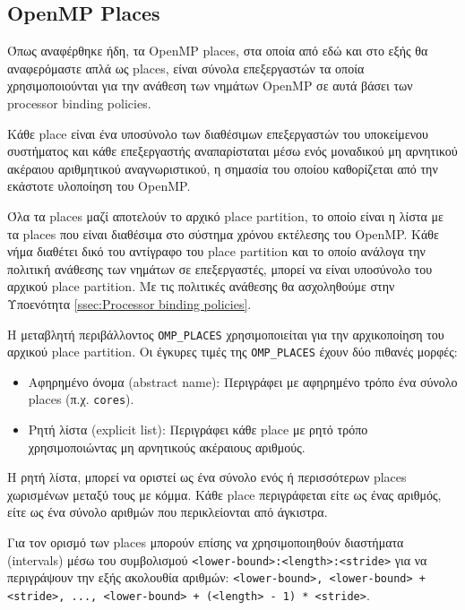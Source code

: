 \subsection{OpenMP Places}
\label{ssec:OpenMP places}
Όπως αναφέρθηκε ήδη, τα OpenMP places, στα οποία από εδώ και στο εξής θα αναφερόμαστε απλά ως places, είναι σύνολα επεξεργαστών τα οποία χρησιμοποιούνται για την ανάθεση των νημάτων OpenMP σε αυτά βάσει των processor binding policies.

Κάθε place είναι ένα υποσύνολο των διαθέσιμων επεξεργαστών του υποκείμενου συστήματος και κάθε επεξεργαστής αναπαρίσταται μέσω ενός μοναδικού μη αρνητικού ακέραιου αριθμητικού αναγνωριστικού, η σημασία του οποίου καθορίζεται από την εκάστοτε υλοποίηση του OpenMP.

Όλα τα places μαζί αποτελούν το αρχικό place partition, το οποίο είναι η λίστα με τα places που είναι διαθέσιμα στο σύστημα χρόνου εκτέλεσης του OpenMP. Κάθε νήμα διαθέτει δικό του αντίγραφο του place partition και το οποίο ανάλογα την πολιτική ανάθεσης των νημάτων σε επεξεργαστές, μπορεί να είναι υποσύνολο του αρχικού place partition. Με τις πολιτικές ανάθεσης θα ασχοληθούμε στην Υποενότητα \ref{ssec:Processor binding policies}.

Η μεταβλητή περιβάλλοντος \texttt{OMP\_PLACES} χρησιμοποιείται για την αρχικοποίηση του αρχικού place partition. Οι έγκυρες τιμές της \texttt{OMP\_PLACES} έχουν δύο πιθανές μορφές:
\begin{itemize}
	\item Αφηρημένο όνομα (abstract name): Περιγράφει με αφηρημένο τρόπο ένα σύνολο places (π.χ. \texttt{cores}).
	\item Ρητή λίστα (explicit list): Περιγράφει κάθε place με ρητό τρόπο χρησιμοποιώντας μη αρνητικούς ακέραιους αριθμούς.
\end{itemize}

Η ρητή λίστα, μπορεί να οριστεί ως ένα σύνολο ενός ή περισσότερων places χωρισμένων μεταξύ τους με κόμμα. Κάθε place περιγράφεται είτε ως ένας αριθμός, είτε ως ένα σύνολο αριθμών που περικλείονται από άγκιστρα.

Για τον ορισμό των places μπορούν επίσης να χρησιμοποιηθούν διαστήματα (intervals) μέσω του συμβολισμού \texttt{<lower-bound>:<length>:<stride>} για να περιγράψουν την εξής ακολουθία αριθμών:
\texttt{<lower-bound>, <lower-bound> + <stride>, ..., <lower-bound> + (<length> - 1) * <stride>}.

